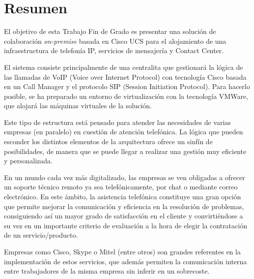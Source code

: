 \documentclass[a4paper, 12pt]{book}
\begin{document}
\chapter*{Resumen}

El objetivo de esta Trabajo Fin de Grado es presentar una solución de colaboración \emph{on-premise} basada en Cisco UCS para el alojamiento de una infraestructura de telefonía IP, servicios de mensajería y Contact Center.

El sistema consiste principalmente de una centralita que gestionará la lógica de las llamadas de VoIP (Voice over Internet Protocol) con tecnología Cisco basada en un Call Manager y el protocolo SIP (Session Initiation Protocol).
Para hacerlo posible, se ha preparado un entorno de virtualización con la tecnología VMWare, que alojará las máquinas virtuales de la solución.

Este tipo de estructura está pensado para atender las necesidades de varias empresas (en paralelo) en cuestión de atención telefónica. La lógica que pueden esconder los distintos elementos de la arquitectura ofrece un sinfín de posibilidades, de manera que se puede llegar a realizar una gestión muy eficiente y personalizada.

En un mundo cada vez más digitalizado, las empresas se ven obligadas a ofrecer un soporte técnico remoto ya sea telefónicamente, por chat o mediante correo electrónico. En este ámbito, la asistencia telefónica constituye una gran opción que permite mejorar la comunicación y eficiencia en la resolución de problemas, consiguiendo así un mayor grado de satisfacción en el cliente y convirtiéndose a su vez en un importante criterio de evaluación a la hora de elegir la contratación de un servicio/producto.

Empresas como Cisco, Skype o Mitel (entre otros) son grandes referentes en la implementación de estos servicios, que además permiten la comunicación interna entre trabajadores de la misma empresa sin inferir en un sobrecoste.

\end{document}
